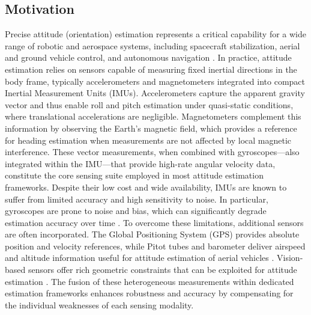 \subsection{Motivation}
Precise attitude (orientation) estimation represents a critical capability for a wide range of robotic and aerospace systems, including spacecraft stabilization, aerial and ground vehicle control, and autonomous navigation \cite{crassidis2007survey}.
 In practice, attitude estimation relies on sensors capable of measuring fixed inertial directions in the body frame, typically accelerometers and magnetometers integrated into compact Inertial Measurement Units (IMUs). Accelerometers capture the apparent gravity vector and thus enable roll and pitch estimation under quasi-static conditions, where translational accelerations are negligible. Magnetometers complement this information by observing the Earth’s magnetic field, which provides a reference for heading 
estimation when measurements are not affected by local magnetic interference. These vector measurements, when combined with gyroscopes—also integrated within the IMU—that provide high-rate angular velocity data, constitute the core sensing suite employed in most attitude estimation frameworks. Despite their low cost and wide availability, IMUs are known to suffer from limited accuracy and high sensitivity to noise. In particular, gyroscopes are prone to noise and bias, which can significantly degrade estimation accuracy over time \cite{lefferts1982kalman}. To overcome these limitations, additional sensors are often incorporated. The Global Positioning System (GPS) provides absolute position and velocity references, while Pitot tubes and barometer deliver airspeed and altitude information useful for attitude  estimation of aerial vehicles \cite{Berkane_cdc_2017_gps,tchonkeu2025baromete,DEOLIVEIRA2024_pitot}. Vision-based sensors offer rich geometric constraints that can be exploited for attitude estimation \cite{Hamel_CDC_2020_Vision_aided}. The fusion of these heterogeneous measurements within dedicated estimation frameworks enhances robustness and accuracy by compensating for the individual weaknesses of each sensing modality.
 
